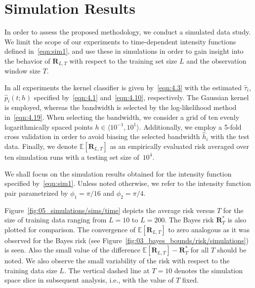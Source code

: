\documentclass[lettersize,journal,onecolumn]{IEEEtran}
\theoremstyle{definition}
\renewcommand{\figurename}{Figure}
\newcommand{\E}[1]{\mathbb{E}\left[#1\right]}
\begin{document}
\section{Simulation Results}
\label{sec:05_simulations}

\noindent In order to assess the proposed methodology, we conduct a simulated data study.
We limit the scope of our experiments to time-dependent intensity functions defined
in~\eqref{eqn:sim1}, and use these in simulations in order to gain insight into the
behavior of $\mathbf{R}_{L,T}$ with respect to the training set size $L$ and the 
observation window size $T$. 

In all experiments the kernel classifier is given by~\eqref{eqn:4.3} with the estimated 
$\widehat{\tau}_i$,\enspace $\widehat{p}_i(t;h)$ specified by~\eqref{eqn:4.1} 
and~\eqref{eqn:4.10}, respectively. The Gaussian kernel is employed,
whereas the bandwidth is selected by the log-likelihood method in~\eqref{eqn:4.19}. 
When selecting the bandwidth, we consider a grid of ten evenly logarithmically spaced 
points $h\in\langle 10^{-1}, 10^{1}\rangle$. Additionally, we employ a 5-fold cross 
validation in order to avoid biasing the selected bandwidth $\widehat{h}_i$ with the test 
data. Finally, we denote $\E{\mathbf{R}_{L,T}}$ as an empirically evaluated risk 
averaged over ten simulation runs with a testing set size of~$10^{4}$.

We shall focus on the simulation results obtained for the intensity 
function specified by~\eqref{eqn:sim1}. Unless noted otherwise, we refer to the 
intensity function pair parametrized by $\phi_{1}=\pi/16$ and $\phi_{2}=\pi/4$.

Figure~\ref{fig:05_simulations/sims/time} depicts the average risk versus $T$ for the 
size of training data ranging from $L=10$ to $L=200$. The Bayes risk 
$\mathbf{R}^{*}_{T}$ is also plotted for comparison. The convergence of  
$\mathbb{E}[\mathbf{R}_{L,T}]$ to zero analogous as it was observed for the Bayes risk
(see \figurename~\ref{fig:03_bayes_bounds/risk/simulations}) is seen.
Also the small value
of the difference $\mathbb{E}[\mathbf{R}_{L,T}] - \mathbf{R}^{*}_{T}$ for all  $T$ 
should be noted. We also observe the small variability of the risk with respect to the 
training data size $L$. The vertical dashed line at $T=10$ denotes the simulation space 
slice in subsequent analysis, i.e., with the value of $T$ fixed.
\end{document}
